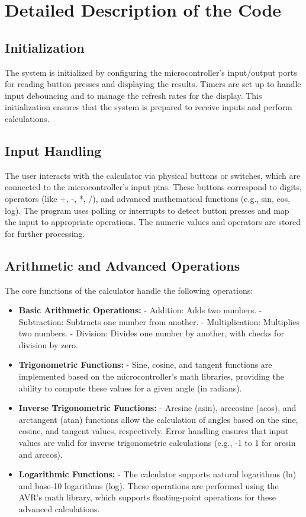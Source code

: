 \documentclass[12pt]{article}
\begin{document}
\section{Detailed Description of the Code}
\subsection{Initialization}
The system is initialized by configuring the microcontroller's input/output ports for reading button presses and displaying the results. Timers are set up to handle input debouncing and to manage the refresh rates for the display. This initialization ensures that the system is prepared to receive inputs and perform calculations.

\subsection{Input Handling}
The user interacts with the calculator via physical buttons or switches, which are connected to the microcontroller's input pins. These buttons correspond to digits, operators (like +, -, *, /), and advanced mathematical functions (e.g., sin, cos, log). The program uses polling or interrupts to detect button presses and map the input to appropriate operations. The numeric values and operators are stored for further processing.

\subsection{Arithmetic and Advanced Operations}
The core functions of the calculator handle the following operations:
\begin{itemize}
    \item \textbf{Basic Arithmetic Operations:} 
    - Addition: Adds two numbers.
    - Subtraction: Subtracts one number from another.
    - Multiplication: Multiplies two numbers.
    - Division: Divides one number by another, with checks for division by zero.

    \item \textbf{Trigonometric Functions:} 
    - Sine, cosine, and tangent functions are implemented based on the microcontroller’s math libraries, providing the ability to compute these values for a given angle (in radians).
    
    \item \textbf{Inverse Trigonometric Functions:} 
    - Arcsine (asin), arccosine (acos), and arctangent (atan) functions allow the calculation of angles based on the sine, cosine, and tangent values, respectively. Error handling ensures that input values are valid for inverse trigonometric calculations (e.g., -1 to 1 for arcsin and arccos).
    
    \item \textbf{Logarithmic Functions:} 
    - The calculator supports natural logarithms (ln) and base-10 logarithms (log). These operations are performed using the AVR's math library, which supports floating-point operations for these advanced calculations.
\end{itemize}
\end{document}
